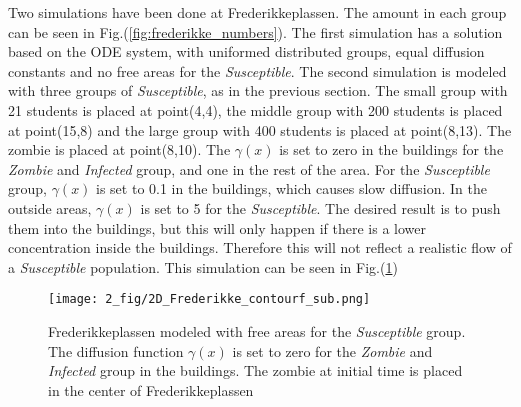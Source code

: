 \documentclass[%
twoside,                 %
final,                   %
chapterprefix=true,      %
open=right               %
10pt]{book}
\begin{document}
\vspace{3mm}




\vspace{3mm}


Two simulations have been done at Frederikkeplassen. The amount in each group can be seen in Fig.(\ref{fig:frederikke_numbers}). The first simulation has a solution based on the ODE system, with uniformed distributed groups, equal diffusion constants and no free areas for the \emph{Susceptible}. The second simulation is modeled with three groups of \emph{Susceptible}, as in the previous section. The small group with 21 students is placed at point(4,4), the middle group with 200 students is placed at point(15,8) and the large group with 400 students is placed at point(8,13). The zombie is placed at point(8,10). The $\gamma(x)$ is set to zero in the buildings for the \emph{Zombie} and \emph{Infected} group, and one in the rest of the area. For the \emph{Susceptible} group, $\gamma(x)$ is set to 0.1 in the buildings, which causes slow diffusion. In the outside areas, $\gamma(x)$ is set to 5 for the \emph{Susceptible}. The desired result is to push them into the buildings, but this will only happen if there is a lower concentration inside the buildings. Therefore this will not reflect a realistic flow of a \emph{Susceptible} population. This simulation can be seen in Fig.(\ref{fig:frederikke_free_area})  


\begin{figure}[ht]
  \centerline{\texttt{[image: 2\_fig/2D\_Frederikke\_contourf\_sub.png]}}
  \caption{
  \label{fig:frederikke_free_area} Frederikkeplassen modeled with free areas for the \emph{Susceptible} group. The diffusion function $\gamma(x)$ is set to zero for the \emph{Zombie} and \emph{Infected} group in the buildings. The zombie at initial time is placed in the center of Frederikkeplassen
  }
\end{figure}




\vspace{3mm}




\vspace{3mm}
\end{document}
